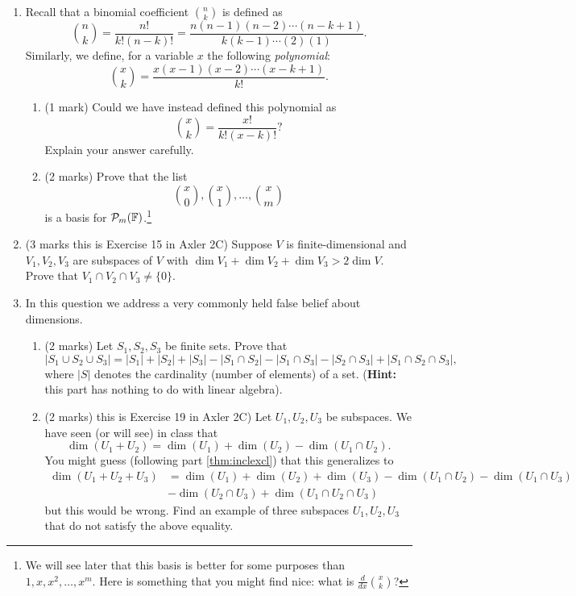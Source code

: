 \documentclass[12pt]{article}
\begin{document}
\begin{enumerate}
\begin{enumerate}
  \end{enumerate}
\item Recall that a binomial coefficient $\binom{n}{k}$ is defined as
  \[
    \binom{n}{k}=\frac{n!}{k!(n-k)!}=\frac{n(n-1)(n-2)\cdots (n-k+1)}{k(k-1)\cdots (2)(1)}.
  \]
  Similarly, we define, for a variable $x$ the following \emph{polynomial}:
  \[
    \binom{x}{k}=\frac{x(x-1)(x-2)\cdots (x-k+1)}{k!}.
  \]
  \begin{enumerate}
  \item (1 mark) Could we have instead defined this polynomial as
    \[
      \binom{x}{k}=\frac{x!}{k!(x-k)!}?
    \]
    Explain your answer carefully.
  \item (2 marks) Prove that the list
    \[
      \binom{x}{0}, \binom{x}{1}, \ldots , \binom{x}{m}
    \]
    is a basis for $\mathcal{P}_m(\mathbb{F})$.\footnote{We will see later that this basis is better for some purposes than $1,x,x^2,\ldots , x^m$. Here is something that you might find nice: what is $\frac{d}{dx}\binom{x}{k}$?}
  \end{enumerate}
\item (3 marks this is Exercise 15 in Axler 2C) Suppose $V$ is finite-dimensional and $V_1,V_2,V_3$ are subspaces of $V$ with $\dim V_1+\dim V_2+\dim V_3>2\dim V$. Prove that $V_1\cap V_2 \cap V_3\neq \{0\}$.
\item In this question we address a very commonly held false belief about dimensions.
  \begin{enumerate}
  \item \label{thm:inclexcl} (2 marks) Let $S_1, S_2, S_3$ be finite sets. Prove that
  \[
    |S_1\cup S_2\cup S_3|=|S_1|+|S_2|+|S_3|-|S_1\cap S_2|-|S_1\cap S_3|-|S_2\cap S_3|+|S_1\cap S_2\cap S_3|,
  \]
  where $|S|$ denotes the cardinality (number of elements) of a set. (\textbf{Hint:} this part has nothing to do with linear algebra).
\item (2 marks) this is Exercise 19 in Axler 2C) Let $U_1, U_2, U_3$ be subspaces. We have seen (or will see) in class that
  \[
    \dim(U_1+U_2)=\dim(U_1)+\dim(U_2)-\dim(U_1\cap U_2).
  \]
  You might guess (following part \ref{thm:inclexcl}) that this generalizes to
  \begin{align*}
    \dim(U_1+U_2+U_3)&=\dim(U_1)+\dim(U_2)+\dim(U_3)-\dim(U_1\cap U_2)-\dim(U_1\cap U_3)\\ &-\dim(U_2\cap U_3)+\dim(U_1\cap U_2\cap U_3)
  \end{align*}
  but this would be wrong. Find an example of three subspaces $U_1, U_2, U_3$ that do not satisfy the above equality.
  \end{enumerate}
\end{enumerate}


{}

\end{document}
